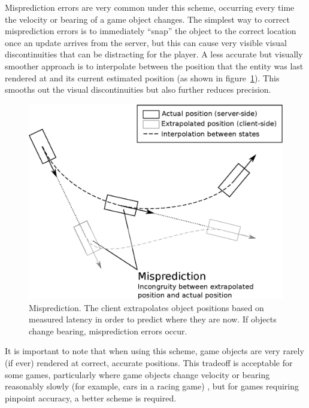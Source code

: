 \documentclass[conference]{IEEEtran}
\begin{document}
	Misprediction errors are very common under this scheme, occurring every time the velocity or bearing of a game object changes. The simplest way to correct misprediction errors is to immediately ``snap'' the object to the correct location once an update arrives from the server, but this can cause very visible visual discontinuities that can be distracting for the player. A less accurate but visually smoother approach is to interpolate between the position that the entity was last rendered at and its current estimated position (as shown in figure~\ref{fig:extrapolation}). This smooths out the visual discontinuities but also further reduces precision.

	\begin{figure}
		\centering\includegraphics[width=\linewidth]{figures/extrapolation.eps}
		\caption{Misprediction. The client extrapolates object positions based on measured latency in order to predict where they are now. If objects change bearing, misprediction errors occur.}
		\label{fig:extrapolation}
	\end{figure}

	It is important to note that when using this scheme, game objects are very rarely (if ever) rendered at correct, accurate positions. This tradeoff is acceptable for some games, particularly where game objects change velocity or bearing reasonably slowly (for example, cars in a racing game) \cite{pantel2002suitability}, but for games requiring pinpoint accuracy, a better scheme is required.

\end{document}

